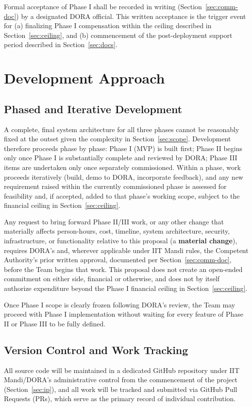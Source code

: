 \documentclass[11pt]{article}
\begin{document}
Formal acceptance of Phase I shall be recorded in writing (Section~\ref{sec:comm-doc}) by a designated DORA official. This written acceptance is the trigger event for (a) finalizing Phase I compensation within the ceiling described in Section~\ref{sec:ceiling}, and (b) commencement of the post-deployment support period described in Section~\ref{sec:docs}.

\section{Development Approach}

\subsection{Phased and Iterative Development}
\label{sec:iterative}
A complete, final system architecture for all three phases cannot be reasonably fixed at the outset given the complexity in Section~\ref{sec:scope}. Development therefore proceeds phase by phase: Phase I (MVP) is built first; Phase II begins only once Phase I is substantially complete and reviewed by DORA; Phase III items are undertaken only once separately commissioned. Within a phase, work proceeds iteratively (build, demo to DORA, incorporate feedback), and any new requirement raised within the currently commissioned phase is assessed for feasibility and, if accepted, added to that phase's working scope, subject to the financial ceiling in Section~\ref{sec:ceiling}.

Any request to bring forward Phase II/III work, or any other change that materially affects person-hours, cost, timeline, system architecture, security, infrastructure, or functionality relative to this proposal (a \textbf{material change}), requires DORA's and, wherever applicable under IIT Mandi rules, the Competent Authority's prior written approval, documented per Section~\ref{sec:comm-doc}, before the Team begins that work. This proposal does not create an open-ended commitment on either side, financial or otherwise, and does not by itself authorize expenditure beyond the Phase I financial ceiling in Section~\ref{sec:ceiling}.

Once Phase I scope is clearly frozen following DORA's review, the Team may proceed with Phase I implementation without waiting for every feature of Phase II or Phase III to be fully defined.

\subsection{Version Control and Work Tracking}
\label{sec:version-control}
All source code will be maintained in a dedicated GitHub repository under IIT Mandi/DORA's administrative control from the commencement of the project (Section~\ref{sec:ip}), and all work will be tracked and submitted via GitHub Pull Requests (PRs), which serve as the primary record of individual contribution.
\end{document}
